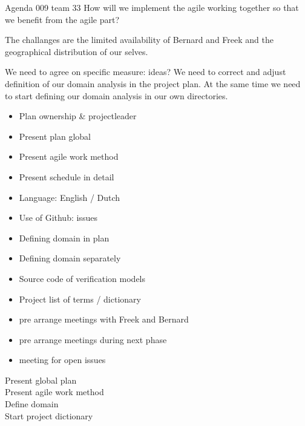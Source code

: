 \documentclass{article}
\begin{document}
\begin{Minutes}{Agenda 009 team 33}
How will we implement the agile working together so that
we benefit from the agile part?

The challanges are the limited availability of Bernard and Freek and the
geographical distribution of our selves.

We need to agree on specific measure: ideas?
We need to correct and adjust definition of our domain analysis in
the project plan. At the same time we need to start defining our domain
analysis in our own directories.
\begin{itemize}
    \item Plan ownership \& projectleader
    \item Present plan global
    \item Present agile work method
    \item Present schedule in detail
\end{itemize}

\begin{itemize}
    \item Language: English / Dutch
    \item Use of Github: issues
    \item Defining domain in plan
    \item Defining domain separately
    \item Source code of verification models
    \item Project list of terms / dictionary
    \item pre arrange meetings with Freek and Bernard
    \item pre arrange meetings during next phase
    \item meeting for open issues
\end{itemize}

\begin{description}
    \item[Present global plan]
    \item[Present agile work method]
    \item[Define domain]
    \item[Start project dictionary]
\end{description}



\end{Minutes}
\end{document}
